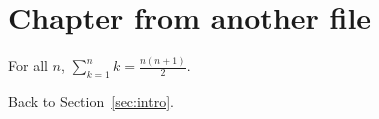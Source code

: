 \section{Chapter from another file}
\begin{theorem}\label{thm:one}
For all $n$, $\sum_{k=1}^n k = \frac{n(n+1)}{2}$.
\end{theorem}
Back to Section~\ref{sec:intro}.
